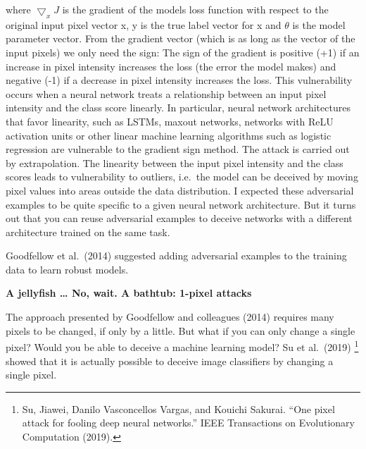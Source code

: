 \documentclass[
  10pt,
]{scrbook}
\begin{document}
where \(\bigtriangledown_x{}J\) is the gradient of the models loss function with respect to the original input pixel vector x, y is the true label vector for x and \(\theta\) is the model parameter vector.
From the gradient vector (which is as long as the vector of the input pixels) we only need the sign:
The sign of the gradient is positive (+1) if an increase in pixel intensity increases the loss (the error the model makes) and negative (-1) if a decrease in pixel intensity increases the loss.
This vulnerability occurs when a neural network treats a relationship between an input pixel intensity and the class score linearly.
In particular, neural network architectures that favor linearity, such as LSTMs, maxout networks, networks with ReLU activation units or other linear machine learning algorithms such as logistic regression are vulnerable to the gradient sign method.
The attack is carried out by extrapolation.
The linearity between the input pixel intensity and the class scores leads to vulnerability to outliers, i.e.~the model can be deceived by moving pixel values into areas outside the data distribution.
I expected these adversarial examples to be quite specific to a given neural network architecture.
But it turns out that you can reuse adversarial examples to deceive networks with a different architecture trained on the same task.

Goodfellow et al.~(2014) suggested adding adversarial examples to the training data to learn robust models.

\textbf{A jellyfish \ldots{} No, wait. A bathtub: 1-pixel attacks}

The approach presented by Goodfellow and colleagues (2014) requires many pixels to be changed, if only by a little.
But what if you can only change a single pixel?
Would you be able to deceive a machine learning model?
Su et al.~(2019) \footnote{Su, Jiawei, Danilo Vasconcellos Vargas, and Kouichi Sakurai. ``One pixel attack for fooling deep neural networks.'' IEEE Transactions on Evolutionary Computation (2019).} showed that it is actually possible to deceive image classifiers by changing a single pixel.
\end{document}
